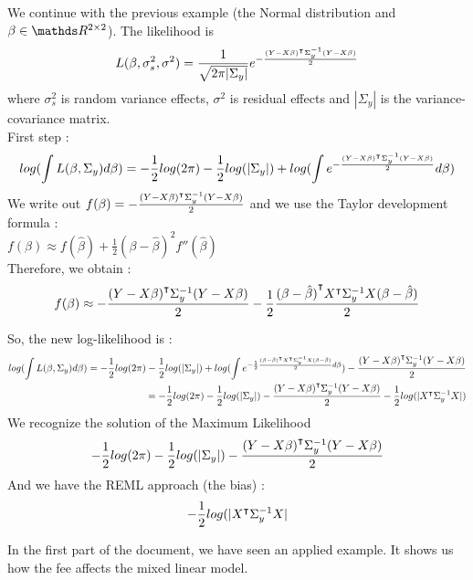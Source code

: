 \documentclass{article}
\begin{document}
\begin{exemple} 
We continue with the previous example (the Normal distribution and $\beta \in \bbR^{2\times 2}$). The likelihood is
\[L(\beta, \sigma_s^2, \sigma^2) = \frac{1}{\sqrt{2\pi |\Sigma_y|}}e^{-\frac{{(Y-X\beta)}^\intercal\Sigma_y^{-1}(Y-X\beta)}{2}}\]
where $\sigma_s^2$ is random variance effects, $\sigma^2$ is residual effects and $|\Sigma_y|$ is the variance-covariance matrix.\\
First step :
\[log(\int L(\beta, \Sigma_y)d\beta) = -\frac{1}{2}log(2\pi)-\frac{1}{2}log(|\Sigma_y|)+log(\int e^{-\frac{{(Y-X\beta)}^\intercal\Sigma_y^{-1}(Y-X\beta)}{2}} d\beta)\]
We write out $f(\beta) = -\frac{{(Y-X\beta)}^\intercal\Sigma_y^{-1}(Y-X\beta)}{2}$ and we use the Taylor development formula : \\
$f(\beta) \approx f(\hat{\beta}) + \frac{1}{2}(\beta - \hat{\beta})^2f''(\hat{\beta})$\\
Therefore, we obtain :
\[f(\beta) \approx -\frac{{(Y-X\beta)}^\intercal\Sigma_y^{-1}(Y-X\beta)}{2}-\frac{1}{2}\frac{{(\beta-\hat{\beta})}^\intercal {X}^\intercal \Sigma_y^{-1}X (\beta-\hat{\beta})}{2}\]

So, the new log-likelihood is :
\begin{equation*}
    \begin{split}
       log(\int L(\beta, \Sigma_y)d\beta) = -\frac{1}{2}log(2\pi)-\frac{1}{2}log(|\Sigma_y|)+log(\int e^{-\frac{1}{2}\frac{{(\beta-\hat{\beta})}^\intercal {X}^\intercal \Sigma_y^{-1}X (\beta-\hat{\beta})}{2} d\beta}) -\frac{{(Y-X\beta)}^\intercal\Sigma_y^{-1}(Y-X\beta)}{2}\\
       =-\frac{1}{2}log(2\pi)-\frac{1}{2}log(|\Sigma_y|)-\frac{{(Y-X\beta)}^\intercal\Sigma_y^{-1}(Y-X\beta)}{2} - \frac{1}{2}log(|{X}^\intercal\Sigma_y^{-1}X|)  
    \end{split}
\end{equation*}
We recognize the solution of the Maximum Likelihood
\[-\frac{1}{2}log(2\pi)-\frac{1}{2}log(|\Sigma_y|)-\frac{{(Y-X\beta)}^\intercal\Sigma_y^{-1}(Y-X\beta)}{2}\]
And we have the REML approach (the bias) : \[- \frac{1}{2}log(|{X}^\intercal \Sigma_y^{-1}X|\]
\end{exemple}
In the first part of the document, we have seen an applied example. It shows us how the fee affects the mixed linear model.

\end{document}
